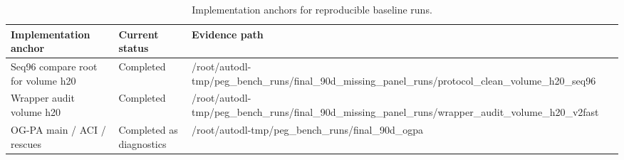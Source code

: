 \begin{table}[t]
\centering
\caption{Implementation anchors for reproducible baseline runs.}
\label{tab:table_30_baseline_anchors}
\begin{tabular}{lll}
\toprule
Implementation anchor & Current status & Evidence path \\
\midrule
Seq96 compare root for volume h20 & Completed & /root/autodl-tmp/peg\_bench\_runs/final\_90d\_missing\_panel\_runs/protocol\_clean\_volume\_h20\_seq96 \\
Wrapper audit volume h20 & Completed & /root/autodl-tmp/peg\_bench\_runs/final\_90d\_missing\_panel\_runs/wrapper\_audit\_volume\_h20\_v2fast \\
OG-PA main / ACI / rescues & Completed as diagnostics & /root/autodl-tmp/peg\_bench\_runs/final\_90d\_ogpa \\
\bottomrule
\end{tabular}
\end{table}
